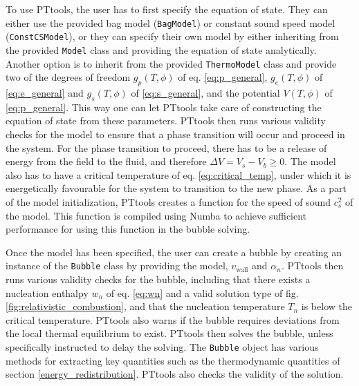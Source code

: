 To use PTtools, the user has to first specify the equation of state.
They can either use the provided bag model (\texttt{BagModel}) or constant sound speed model (\texttt{ConstCSModel}),
or they can specify their own model by either inheriting from the provided \texttt{Model} class and providing the equation of state analytically.
Another option is to inherit from the provided \texttt{ThermoModel} class and provide two of the degrees of freedom $g_p(T,\phi)$ of eq. \eqref{eq:p_general}, $g_e(T,\phi)$ of \eqref{eq:e_general} and $g_s(T,\phi)$ of \eqref{eq:s_general}, and the potential $V(T,\phi)$ of \eqref{eq:p_general}.
This way one can let PTtools take care of constructing the equation of state from these parameters.
PTtools then runs various validity checks for the model to ensure that a phase transition will occur and proceed in the system.
For the phase transition to proceed, there has to be a release of energy from the field to the fluid,
and therefore $\Delta V = V_s - V_b \geq 0$.
The model also has to have a critical temperature of eq. \eqref{eq:critical_temp},
under which it is energetically favourable for the system to transition to the new phase.
As a part of the model initialization, PTtools creates a function for the speed of sound $c_s^2$ of the model.
This function is compiled using Numba to achieve sufficient performance for using this function in the bubble solving.

Once the model has been specified,
the user can create a bubble by creating an instance of the \texttt{Bubble} class by providing the model, $v_\text{wall}$ and $\alpha_n$.
PTtools then runs various validity checks for the bubble,
including that there exists a nucleation enthalpy $w_n$ of eq. \eqref{eq:wn} and a valid solution type of fig. \ref{fig:relativistic_combustion},
and that the nucleation temperature $T_n$ is below the critical temperature.
PTtools also warns if the bubble requires deviations from the local thermal equilibrium to exist.
PTtools then solves the bubble, unless specifically instructed to delay the solving.
The \texttt{Bubble} object has various methods for extracting key quantities such as the thermodynamic quantities of section \ref{energy_redistribution}.
PTtools also checks the validity of the solution.

